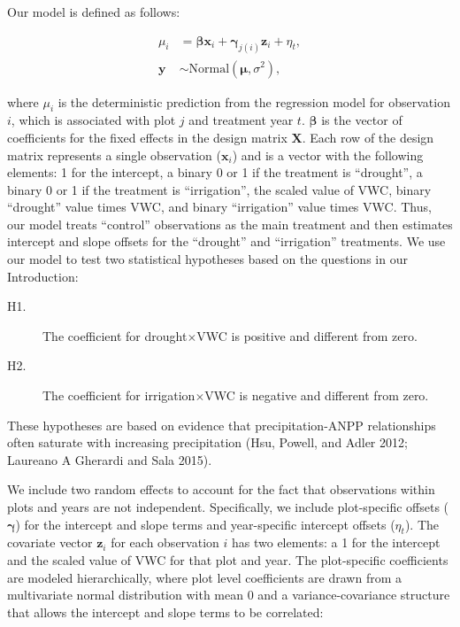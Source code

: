 \documentclass[fleqn,10pt,lineno]{wlpeerj} %
\begin{document}
Our model is defined as follows:

\vspace{-2em}

\begin{align}
\mu_{i} &= \boldsymbol{\beta}\textbf{x}_i + \boldsymbol{\gamma}_{j(i)}\textbf{z}_i + \eta_t, \\
\textbf{y} &\sim \text{Normal} \left(\boldsymbol{\mu}, \sigma^2 \right),
\end{align}

\noindent{}where \(\mu_{i}\) is the deterministic prediction from the
regression model for observation \(i\), which is associated with plot
\(j\) and treatment year \(t\). \(\boldsymbol{\beta}\) is the vector of
coefficients for the fixed effects in the design matrix \(\textbf{X}\).
Each row of the design matrix represents a single observation
(\(\textbf{x}_i\)) and is a vector with the following elements: 1 for
the intercept, a binary 0 or 1 if the treatment is ``drought'', a binary
0 or 1 if the treatment is ``irrigation'', the scaled value of VWC,
binary ``drought'' value times VWC, and binary ``irrigation'' value
times VWC. Thus, our model treats ``control'' observations as the main
treatment and then estimates intercept and slope offsets for the
``drought'' and ``irrigation'' treatments. We use our model to test two
statistical hypotheses based on the questions in our Introduction:

\begin{description}
\item [H1.] The coefficient for drought$\times$VWC is positive and different from zero.
\item [H2.] The coefficient for irrigation$\times$VWC is negative and different from zero.
\end{description}

\noindent{}These hypotheses are based on evidence that
precipitation-ANPP relationships often saturate with increasing
precipitation (Hsu, Powell, and Adler 2012; Laureano A Gherardi and Sala
2015).

We include two random effects to account for the fact that observations
within plots and years are not independent. Specifically, we include
plot-specific offsets (\(\boldsymbol{\gamma}\)) for the intercept and
slope terms and year-specific intercept offsets (\(\eta_t\)). The
covariate vector \(\textbf{z}_i\) for each observation \(i\) has two
elements: a 1 for the intercept and the scaled value of VWC for that
plot and year. The plot-specific coefficients are modeled
hierarchically, where plot level coefficients are drawn from a
multivariate normal distribution with mean 0 and a variance-covariance
structure that allows the intercept and slope terms to be correlated:
\end{document}
